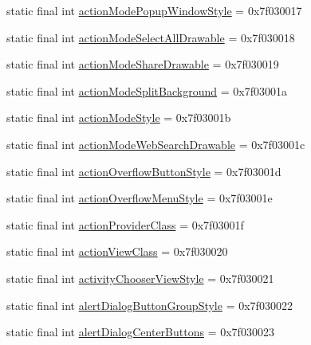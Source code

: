 \begin{DoxyCompactItemize}
\item 
static final int \mbox{\hyperlink{classandroid_1_1support_1_1design_1_1_r_1_1attr_a36582c93d9f5ca55e25c3f8913820b49}{action\+Mode\+Popup\+Window\+Style}} = 0x7f030017
\item 
static final int \mbox{\hyperlink{classandroid_1_1support_1_1design_1_1_r_1_1attr_ab2a713bb29967a97cd4d8bebfa65b9ba}{action\+Mode\+Select\+All\+Drawable}} = 0x7f030018
\item 
static final int \mbox{\hyperlink{classandroid_1_1support_1_1design_1_1_r_1_1attr_aaf7fd84ea5fbf46843fca2dd2376d8da}{action\+Mode\+Share\+Drawable}} = 0x7f030019
\item 
static final int \mbox{\hyperlink{classandroid_1_1support_1_1design_1_1_r_1_1attr_a063adaf7bf2aedb313fccd7c9c406286}{action\+Mode\+Split\+Background}} = 0x7f03001a
\item 
static final int \mbox{\hyperlink{classandroid_1_1support_1_1design_1_1_r_1_1attr_ac448239603f330b08cc4a76a2d01704d}{action\+Mode\+Style}} = 0x7f03001b
\item 
static final int \mbox{\hyperlink{classandroid_1_1support_1_1design_1_1_r_1_1attr_a738dea168ce0bf399bfe38eccce9b38e}{action\+Mode\+Web\+Search\+Drawable}} = 0x7f03001c
\item 
static final int \mbox{\hyperlink{classandroid_1_1support_1_1design_1_1_r_1_1attr_ad924f1960d613f38bbea6490e7bafac3}{action\+Overflow\+Button\+Style}} = 0x7f03001d
\item 
static final int \mbox{\hyperlink{classandroid_1_1support_1_1design_1_1_r_1_1attr_ab8ba6f67460fb8b21432c3855ba1dc3b}{action\+Overflow\+Menu\+Style}} = 0x7f03001e
\item 
static final int \mbox{\hyperlink{classandroid_1_1support_1_1design_1_1_r_1_1attr_ace4d4f4767149f10652ae11fa37ba6b4}{action\+Provider\+Class}} = 0x7f03001f
\item 
static final int \mbox{\hyperlink{classandroid_1_1support_1_1design_1_1_r_1_1attr_afa305c5b28100674d981f2d3159f14fe}{action\+View\+Class}} = 0x7f030020
\item 
static final int \mbox{\hyperlink{classandroid_1_1support_1_1design_1_1_r_1_1attr_a772f9b819db28308273b08c1e3927173}{activity\+Chooser\+View\+Style}} = 0x7f030021
\item 
static final int \mbox{\hyperlink{classandroid_1_1support_1_1design_1_1_r_1_1attr_af6b9ec9b563431092df394acb9ab9d3a}{alert\+Dialog\+Button\+Group\+Style}} = 0x7f030022
\item 
static final int \mbox{\hyperlink{classandroid_1_1support_1_1design_1_1_r_1_1attr_a0fe920d2f800df2ca3cb9f9c78b5a63d}{alert\+Dialog\+Center\+Buttons}} = 0x7f030023

\end{DoxyCompactItemize}
